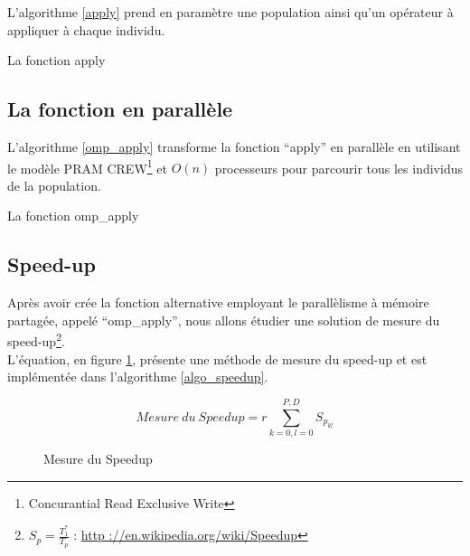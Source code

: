 L'algorithme \ref{apply} prend en paramètre une population ainsi qu'un opérateur à appliquer à chaque individu.

\incmargin{1em}
\begin{algorithm}[here]
  \dontprintsemicolon
  \label{apply}
  \caption{La fonction apply}
\end{algorithm}
\decmargin{1em}

\subsection{La fonction en parallèle}

L'algorithme \ref{omp_apply} transforme la fonction ``apply'' en parallèle en utilisant le modèle PRAM CREW\footnote{Concurantial Read Exclusive Write} et $O(n)$ processeurs pour parcourir tous les individus de la population.

\incmargin{1em}
\begin{algorithm}[here]
  \dontprintsemicolon
  \label{omp_apply}
  \caption{La fonction omp\_apply}
\end{algorithm}
\decmargin{1em}

\subsection{Speed-up}

Après avoir crée la fonction alternative employant le parallèlisme à mémoire partagée, appelé ``omp\_apply'', nous allons étudier une solution de mesure du speed-up\footnote{$S_p = \frac{T_1^*}{T_p}$ : \url{http ://en.wikipedia.org/wiki/Speedup}}.\\

L'équation, en figure \ref{fig:mesure_speedup}, présente une méthode de mesure du speed-up et est implémentée dans l'algorithme \ref{algo_speedup}.

\begin{figure}[here]
\centering
$$Mesure\ du\ Speedup = r \sum^{P,D}_{k=0,l=0} S_{p_{kl}}$$
\caption{Mesure du Speedup}
\label{fig:mesure_speedup}
\end{figure}

